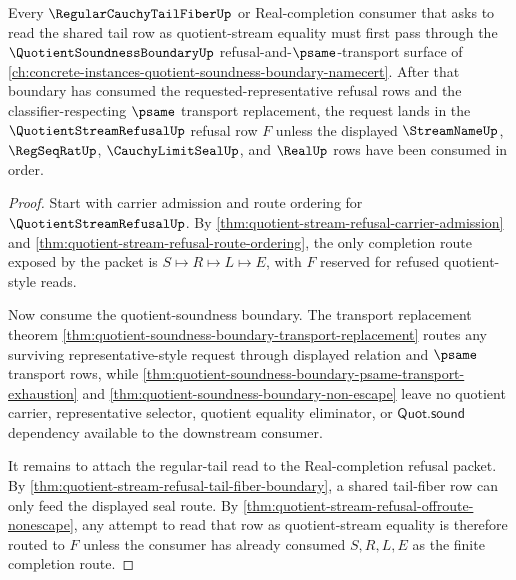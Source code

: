 \begin{theorem}
\label{thm:quotient-stream-refusal-regular-tail-factorization}
Every $\RegularCauchyTailFiberUp$ or Real-completion consumer that asks to read the shared tail row as quotient-stream equality must first pass through the $\QuotientSoundnessBoundaryUp$ refusal-and-$\psame$-transport surface of \autoref{ch:concrete-instances-quotient-soundness-boundary-namecert}. After that boundary has consumed the requested-representative refusal rows and the classifier-respecting $\psame$ transport replacement, the request lands in the $\QuotientStreamRefusalUp$ refusal row $F$ unless the displayed $\StreamNameUp$, $\RegSeqRatUp$, $\CauchyLimitSealUp$, and $\RealUp$ rows have been consumed in order.
\end{theorem}
\begin{proof}
Start with carrier admission and route ordering for $\QuotientStreamRefusalUp$. By \autoref{thm:quotient-stream-refusal-carrier-admission} and \autoref{thm:quotient-stream-refusal-route-ordering}, the only completion route exposed by the packet is $S \longmapsto R \longmapsto L \longmapsto E$, with $F$ reserved for refused quotient-style reads.

Now consume the quotient-soundness boundary. The transport replacement theorem \autoref{thm:quotient-soundness-boundary-transport-replacement} routes any surviving representative-style request through displayed relation and $\psame$ transport rows, while \autoref{thm:quotient-soundness-boundary-psame-transport-exhaustion} and \autoref{thm:quotient-soundness-boundary-non-escape} leave no quotient carrier, representative selector, quotient equality eliminator, or $\mathsf{Quot.sound}$ dependency available to the downstream consumer.

It remains to attach the regular-tail read to the Real-completion refusal packet. By \autoref{thm:quotient-stream-refusal-tail-fiber-boundary}, a shared tail-fiber row can only feed the displayed seal route. By \autoref{thm:quotient-stream-refusal-offroute-nonescape}, any attempt to read that row as quotient-stream equality is therefore routed to $F$ unless the consumer has already consumed $S,R,L,E$ as the finite completion route.
\end{proof}

